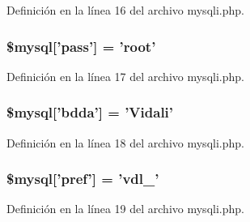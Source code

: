 Definición en la línea 16 del archivo mysqli.\-php.

\hypertarget{mysqli_8php_a29834c14ccc128006f5f4ff30417762a}{
\subsubsection[{\$mysql}]{\setlength{\rightskip}{0pt plus 5cm}\${\bf mysql}\mbox{[}'pass'\mbox{]} = 'root'}}\label{mysqli_8php_a29834c14ccc128006f5f4ff30417762a}


Definición en la línea 17 del archivo mysqli.\-php.

\hypertarget{mysqli_8php_ad8cf4b12c73eaf96b253c794a223a506}{
\subsubsection[{\$mysql}]{\setlength{\rightskip}{0pt plus 5cm}\${\bf mysql}\mbox{[}'bdda'\mbox{]} = 'Vidali'}}\label{mysqli_8php_ad8cf4b12c73eaf96b253c794a223a506}


Definición en la línea 18 del archivo mysqli.\-php.

\hypertarget{mysqli_8php_a289b7ce8a1af0f5281112b43967b5e67}{
\subsubsection[{\$mysql}]{\setlength{\rightskip}{0pt plus 5cm}\${\bf mysql}\mbox{[}'pref'\mbox{]} = 'vdl\-\_\-'}}\label{mysqli_8php_a289b7ce8a1af0f5281112b43967b5e67}


Definición en la línea 19 del archivo mysqli.\-php.

